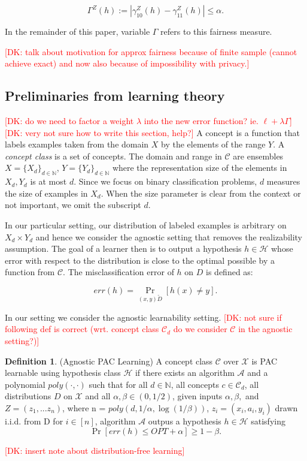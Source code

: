 \documentclass[format = sigconf]{acmart}
\newcommand{\dk}[1]{\textcolor{red}{[DK: #1]}}
\newcommand{\A}{\mathcal{A}}
\renewcommand{\H}{\mathcal{H}}
\renewcommand{\C}{\mathcal{C}}
\newcommand{\X}{\mathcal{X}}
\newcommand{\1}{\mathbbm{1}}
\newcommand{\N}{\mathbb{N}}
\newcommand{\gz}[1]{\gamma_{#1}^Z(h)}
\theoremstyle{definition}
\newtheorem{defn}{Definition}[section]
\begin{document}
$$\Gamma^Z(h) := |\gz{10} - \gz{11}| \leq \alpha.$$

In the remainder of this paper, variable $\Gamma$ refers to this
fairness measure. 

\dk {talk about motivation for approx fairness because of finite sample
(cannot achieve exact) and now also because of impossibility with privacy.}

\subsection{Preliminaries from learning theory}
\dk {do we need to factor a weight $\lambda$ into the new error
function? ie. $\ell + \lambda \Gamma$}
\dk {very not sure how to write this section, help?}
A concept is a function that labels examples taken from the domain $X$
by the elements of the range $Y$. A \emph{concept class} is a set of
concepts. The domain and range in $\C$ are ensembles $X= \{X_d\}_{d\in
\N}$, $Y= \{Y_d\}_{d\in \N}$ where the representation size of the
elements in $X_d,Y_d$ is at most $d$. Since we focus on binary
classification problems, $d$ measures the size of examples in $X_d$.
When the size parameter is clear from the context or not important, we
omit the subscript $d$.

In our particular setting, our distribution of labeled examples is
arbitrary on $X_d \times Y_d$ and hence we consider the agnostic
setting that removes the realizability assumption. The goal of a
learner then is to output a hypothesis $h \in \H$ whose error with
respect to the distribution is close to the optimal possible by a
function from $\C$. The misclassification error of $h$ on $D$ is
defined as:

$$err(h) = \Pr_{(x,y) \tilde D}[h(x) \neq y].$$

In our setting we consider the agnostic learnability setting.
\dk {not sure if following def is correct (wrt. concept class $\C_d$ do
we consider $\C$ in the agnostic setting?)}
\begin{defn}
	(Agnostic PAC Learning) A concept class $\C$ over $\X$ is PAC
  learnable using hypothesis class $\H$ if there exists an algorithm
  $\A$ and a polynomial $poly(\cdot,\cdot)$ such that for all $d \in
  \mathbb{N}$, all concepts $c \in \mathcal{C}_d$, all distributions
  $D$ on $\X$ and all $\alpha,\beta \in (0,1/2)$, given inputs
  $\alpha,\beta,$ and $Z = (z_1, ... z_n)$, where n = $poly(d,
  1/\alpha, \log(1/\beta))$, $z_i = (x_i, a_i, y_i)$ drawn i.i.d. from
  D for $i \in [n]$, algorithm $\A$ outpus a hypothesis $h \in \H$
  satisfying
	$$\Pr[err(h) \leq OPT + \alpha] \geq 1-\beta.$$

\end{defn}
\dk {insert note about distribution-free learning}
\end{document}
